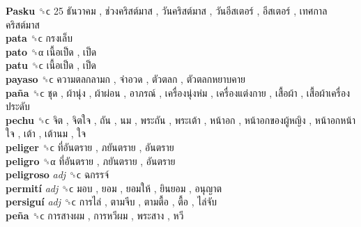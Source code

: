 \textbf{Pasku} ␝ϲ   25 ธันวาคม ,  ช่วงคริสต์มาส ,  วันคริสต์มาส ,  วันอีสเตอร์ ,  อีสเตอร์ ,  เทศกาลคริสต์มาส   \\
\textbf{pata} ␝ϲ   กรงเล็บ   \\
\textbf{pato} ␝α   เนื้อเป็ด ,  เป็ด   \\
\textbf{patu} ␝ϲ   เนื้อเป็ด ,  เป็ด   \\
\textbf{payaso} ␝ϲ   ความตลกลามก ,  จำอวด ,  ตัวตลก ,  ตัวตลกหยาบคาย   \\
\textbf{paña} ␝ϲ   ชุด ,  ผ้านุ่ง ,  ผ้าผ่อน ,  อาภรณ์ ,  เครื่องนุ่งห่ม ,  เครื่องแต่งกาย ,  เสื้อผ้า ,  เสื้อผ้าเครื่องประดับ   \\
\textbf{pechu} ␝ϲ   จิต ,  จิตใจ ,  ถัน ,  นม ,  พระถัน ,  พระเต้า ,  หน้าอก ,  หน้าอกของผู้หญิง ,  หน้าอกหน้าใจ ,  เต้า ,  เต้านม ,  ใจ   \\
\textbf{peliger} ␝ϲ   ที่อันตราย ,  ภยันตราย ,  อันตราย   \\
\textbf{peligro} ␝α   ที่อันตราย ,  ภยันตราย ,  อันตราย   \\
\textbf{peligroso} \emph{adj}  ␝ϲ   ฉกรรจ์   \\
\textbf{permití} \emph{adj}  ␝ϲ   มอบ ,  ยอม ,  ยอมให้ ,  ยินยอม ,  อนุญาต   \\
\textbf{persiguí} \emph{adj}  ␝ϲ   การไล่ ,  ตามจีบ ,  ตามตื้อ ,  ตื้อ ,  ไล่จับ   \\
\textbf{peña} ␝ϲ   การสางผม ,  การหวีผม ,  พระสาง ,  หวี   \\

